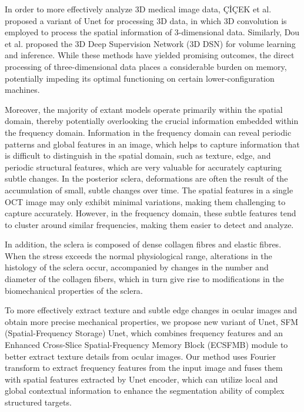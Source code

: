 \documentclass[AMA,Times1COL]{WileyNJDv5} %
\begin{document}
In order to more effectively analyze 3D medical image data, ÇİÇEK et al.\cite{cciccek20163d} proposed a variant of Unet for processing 3D data, in which 3D convolution is employed to process the spatial information of 3-dimensional data. Similarly, Dou et al.\cite{dou20163d} proposed the 3D Deep Supervision Network (3D DSN) for volume learning and inference. While these methods have yielded promising outcomes, the direct processing of three-dimensional data places a considerable burden on memory, potentially impeding its optimal functioning on certain lower-configuration machines.

Moreover, the majority of extant models operate primarily within the spatial domain, thereby potentially overlooking the crucial information embedded within the frequency domain. Information in the frequency domain can reveal periodic patterns and global features in an image, which helps to capture information that is difficult to distinguish in the spatial domain\cite{huang2023fvfsnet,hai2022combining}, such as texture, edge, and periodic structural features, which are very valuable for accurately capturing subtle changes. In the posterior sclera, deformations are often the result of the accumulation of small, subtle changes over time. The spatial features in a single OCT image may only exhibit minimal variations, making them challenging to capture accurately. However, in the frequency domain, these subtle features tend to cluster around similar frequencies, making them easier to detect and analyze.

In addition, the sclera is composed of dense collagen fibres and elastic fibres\cite{campbell2021biomechanical}. When the stress exceeds the normal physiological range, alterations in the histology of the sclera occur, accompanied by changes in the number and diameter of the collagen fibers, which in turn give rise to modifications in the biomechanical properties of the sclera\cite{yasir2024scleral}. 

To more effectively extract texture and subtle edge changes in ocular images and obtain more precise mechanical properties, we propose new variant of Unet, SFM (Spatial-Frequency Storage) Unet, which combines frequency features and an Enhanced Cross-Slice Spatial-Frequency Memory Block (ECSFMB) module to better extract texture details from ocular images. Our method uses Fourier transform to extract frequency features from the input image and fuses them with spatial features extracted by Unet encoder, which can utilize local and global contextual information to enhance the segmentation ability of complex structured targets. 
\end{document}
